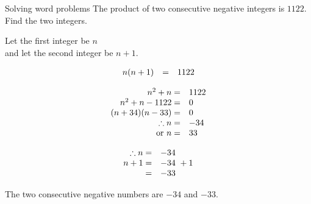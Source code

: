 \begin{wex}
{Solving word problems }
{
The product of two consecutive negative integers is $1122$. Find the two integers.
} 
{
Let the first integer be $n$ 
\\and let the second integer be $n+1$.\par 

\begin{equation*}
\begin{array}{cll}\hfill n(n+1)& =& 1122\hfill \end{array}
\end{equation*}

\begin{equation*}
    \begin{array}{cll}
	\hfill n^{2} + n =& 1122\hfill \\
\hfill n^{2} + n - 1122 =& 0\hfill \\
\hfill (n+34)(n-33) =& 0\hfill \\
	\hfill \therefore  n =& -34 \hfill \\
\hfill \mbox{ or } n =& 33\hfill 
    \end{array}
\end{equation*}

\begin{equation*}
    \begin{array}{cll}
	\hfill \therefore n =& -34\hfill \\
\hfill n + 1 =& -34\ + 1 \hfill \\
\hfill  =& -33\hfill \\

    \end{array}
\end{equation*}

The two consecutive negative numbers are $-34$ and $-33$.
}
\end{wex}

